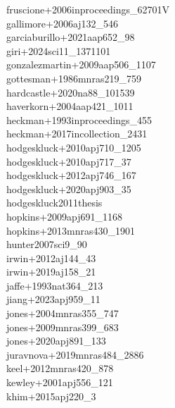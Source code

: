 \documentclass{article}
\begin{document}
\noindent fruscione+2006inproceedings_62701V \color{black} \\
\noindent gallimore+2006aj132_546 \color{black} \\
\noindent garciaburillo+2021aap652_98 \color{black} \\
\noindent giri+2024sci11_1371101 \color{black} \\
\noindent gonzalezmartin+2009aap506_1107 \color{black} \\
\noindent gottesman+1986mnras219_759 \color{black} \\
\noindent hardcastle+2020na88_101539 \color{black} \\
\noindent haverkorn+2004aap421_1011 \color{black} \\
\noindent heckman+1993inproceedings_455 \color{black} \\
\noindent heckman+2017incollection_2431 \color{black} \\
\noindent hodgeskluck+2010apj710_1205 \color{black} \\
\noindent hodgeskluck+2010apj717_37 \color{black} \\
\noindent hodgeskluck+2012apj746_167 \color{black} \\
\noindent hodgeskluck+2020apj903_35 \color{black} \\
\noindent hodgeskluck2011thesis \color{black} \\
\noindent hopkins+2009apj691_1168 \color{black} \\
\noindent hopkins+2013mnras430_1901 \color{black} \\
\noindent hunter2007sci9_90 \color{black} \\
\noindent irwin+2012aj144_43 \color{black} \\
\noindent irwin+2019aj158_21 \color{black} \\
\noindent jaffe+1993nat364_213 \color{black} \\
\noindent jiang+2023apj959_11 \color{black} \\
\noindent jones+2004mnras355_747 \color{black} \\
\noindent jones+2009mnras399_683 \color{black} \\
\noindent jones+2020apj891_133 \color{black} \\
\noindent juravnova+2019mnras484_2886 \color{black} \\
\noindent keel+2012mnras420_878 \color{black} \\
\noindent kewley+2001apj556_121 \color{black} \\
\noindent khim+2015apj220_3 \color{black} \\
\end{document}
